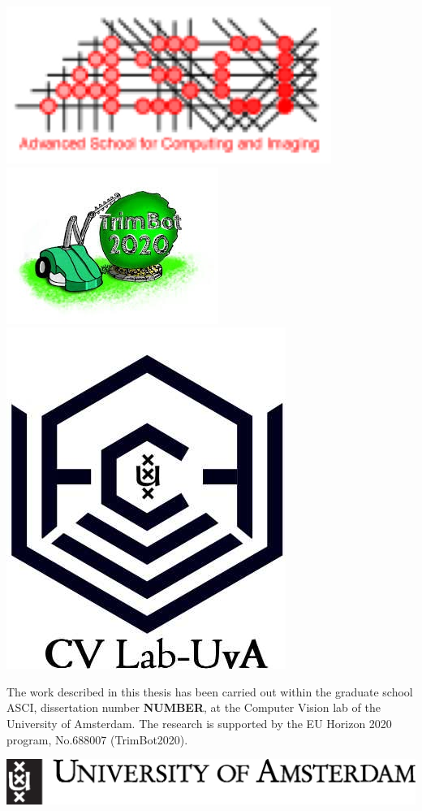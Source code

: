 
	\begin{center}
	    \includegraphics[width=.2\textwidth]{ascilogo.png}
	    \includegraphics[width=.2\textwidth]{tblogo.jpg}
	    \includegraphics[width=.13\textwidth]{cv2.jpeg}
	\end{center}
	\noindent The work described in this thesis has been carried out within the
	graduate school ASCI, dissertation number \textbf{NUMBER}, at the Computer
	Vision lab of the University of Amsterdam. The research is supported by the EU
	Horizon 2020 program, No.688007 (TrimBot2020). \\
	\begin{center}
	    \includegraphics[width=.4\textwidth]{uvalogo.eps}
	\end{center}
	